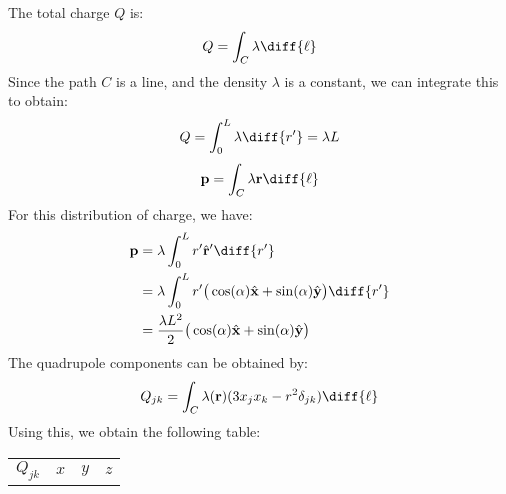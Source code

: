 \documentclass[crop=false,class=book,oneside]{standalone}
\begin{document}
            \begin{solution}
                The total charge $Q$ is:
                \begin{equation}
                    Q=\int_{C}\lambda\diff{\ell}
                \end{equation}
                Since the path $C$ is a line, and the density
                $\lambda$ is a constant, we can integrate this
                to obtain:
                \begin{equation}
                    Q=\int_{0}^{L}\lambda\diff{r'}=\lambda{L}
                \end{equation}
                \begin{equation}
                    \mathbf{p}=\int_{C}\lambda\mathbf{r}\diff{\ell}
                \end{equation}
                For this distribution of charge, we have:
                \begin{subequations}
                    \begin{align}
                        \mathbf{p}&=
                            \lambda\int_{0}^{L}r'\hat{\mathbf{r}}'
                                \diff{r'}\\
                        &=\lambda\int_{0}^{L}r'
                            \big(\cos(\alpha)\hat{\mathbf{x}}+
                                 \sin(\alpha)\hat{\mathbf{y}}\big)
                                    \diff{r'}\\
                        &=\frac{\lambda{L}^{2}}{2}
                            \big(\cos(\alpha)\hat{\mathbf{x}}+
                                 \sin(\alpha)\hat{\mathbf{y}}\big)
                    \end{align}
                \end{subequations}
                The quadrupole components can be obtained by:
                \begin{equation}
                    Q_{jk}=\int_{C}\lambda(\mathbf{r})
                        (3x_{j}x_{k}-r^{2}\delta_{jk})\diff{\ell}
                \end{equation}
                Using this, we obtain the following table:
                \begin{table}[H]
                    \centering
                    \captionsetup{type=table}
                    \begin{tabular}{|c|c|c|c|}
                        \hline
                        $Q_{jk}$&$x$&$y$&$z$\\

\end{tabular}
\end{table}
\end{solution}
\end{document}
